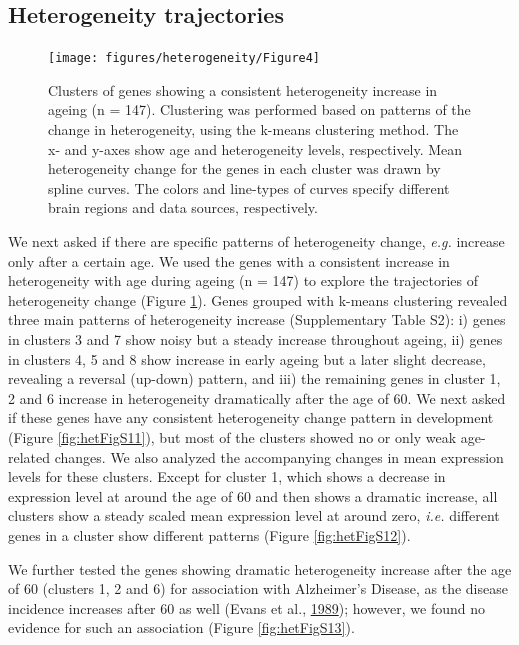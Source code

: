 \documentclass[12pt,twoside]{unicam}
\begin{document}
\hypertarget{heterogeneity-trajectories}{%
\subsection{Heterogeneity trajectories}\label{heterogeneity-trajectories}}

\begin{figure}

{\centering \texttt{[image: figures/heterogeneity/Figure4]} 

}

\caption[Clusters of genes showing a consistent heterogeneity increase in ageing]{Clusters of genes showing a consistent heterogeneity increase in ageing (n = 147). Clustering was performed based on patterns of the change in heterogeneity, using the k-means clustering method. The x- and y-axes show age and heterogeneity levels, respectively. Mean heterogeneity change for the genes in each cluster was drawn by spline curves. The colors and line-types of curves specify different brain regions and data sources, respectively.}\label{fig:hetFig4}
\end{figure}

We next asked if there are specific patterns of heterogeneity change, \emph{e.g.} increase only after a certain age. We used the genes with a consistent increase in heterogeneity with age during ageing (n = 147) to explore the trajectories of heterogeneity change (Figure \ref{fig:hetFig4}). Genes grouped with k-means clustering revealed three main patterns of heterogeneity increase (Supplementary Table S2): i) genes in clusters 3 and 7 show noisy but a steady increase throughout ageing, ii) genes in clusters 4, 5 and 8 show increase in early ageing but a later slight decrease, revealing a reversal (up-down) pattern, and iii) the remaining genes in cluster 1, 2 and 6 increase in heterogeneity dramatically after the age of 60. We next asked if these genes have any consistent heterogeneity change pattern in development (Figure \ref{fig:hetFigS11}), but most of the clusters showed no or only weak age-related changes. We also analyzed the accompanying changes in mean expression levels for these clusters. Except for cluster 1, which shows a decrease in expression level at around the age of 60 and then shows a dramatic increase, all clusters show a steady scaled mean expression level at around zero, \emph{i.e.} different genes in a cluster show different patterns (Figure \ref{fig:hetFigS12}).

We further tested the genes showing dramatic heterogeneity increase after the age of 60 (clusters 1, 2 and 6) for association with Alzheimer's Disease, as the disease incidence increases after 60 as well (Evans et al., \protect\hyperlink{ref-Evans1989}{1989}); however, we found no evidence for such an association (Figure \ref{fig:hetFigS13}).
\end{document}
